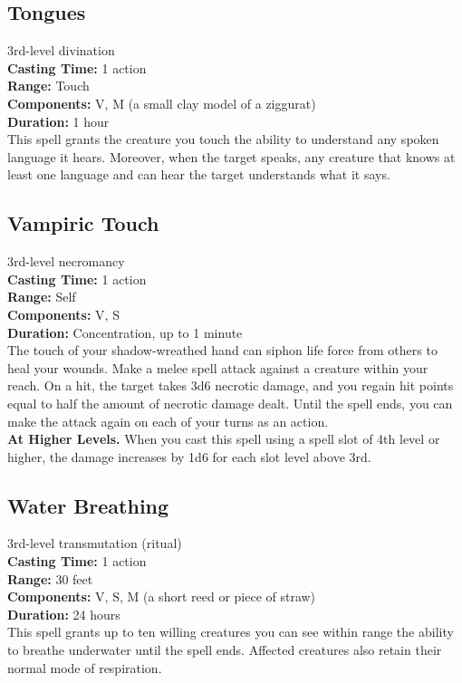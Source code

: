 \documentclass[11pt, A4paper, english]{article}
\begin{document}
		\subsection{Tongues}
3rd-level divination \\
\textbf{Casting Time:} 1 action \\
\textbf{Range:} Touch \\
\textbf{Components:} V, M (a small clay model of a ziggurat) \\
\textbf{Duration:} 1 hour \\
This spell grants the creature you touch the ability to understand any spoken language it hears. Moreover, when the target speaks, any creature that knows at least one language and can hear the target understands what it says.

		\subsection{Vampiric Touch}
3rd-level necromancy \\
\textbf{Casting Time:} 1 action \\
\textbf{Range:} Self \\
\textbf{Components:} V, S \\
\textbf{Duration:} Concentration, up to 1 minute \\
The touch of your shadow-wreathed hand can siphon life force from others to heal your wounds. Make a melee spell attack against a creature within your reach. On a hit, the target takes 3d6 necrotic damage, and you regain hit points equal to half the amount of necrotic damage dealt. Until the spell ends, you can make the attack again on each of your turns as an action. \\
\textbf{At Higher Levels.} When you cast this spell using a spell slot of 4th level or higher, the damage increases by 1d6 for each slot level above 3rd.

		\subsection{Water Breathing}
3rd-level transmutation (ritual) \\
\textbf{Casting Time:} 1 action \\
\textbf{Range:} 30 feet \\
\textbf{Components:} V, S, M (a short reed or piece of straw) \\
\textbf{Duration:} 24 hours \\
This spell grants up to ten willing creatures you can see within range the ability to breathe underwater until the spell ends. Affected creatures also retain their normal mode of respiration.
\end{document}

